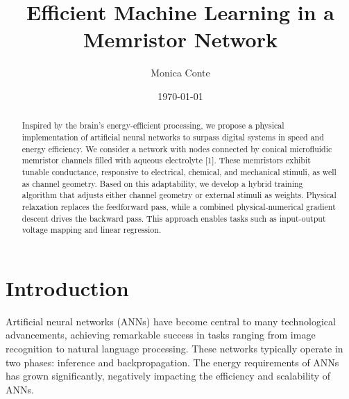 \documentclass[reprint,superscriptaddress,prb,showkeys]{revtex4-2}
\begin{document}
\title{Efficient Machine Learning in a Memristor Network}

\author{Monica Conte}

\date{\today}

\begin{abstract}
Inspired by the brain's energy-efficient processing, we propose a physical implementation of artificial neural networks to surpass digital systems in speed and energy efficiency. We consider a network with nodes connected by conical microfluidic memristor channels filled with aqueous electrolyte [1]. These memristors exhibit tunable conductance, responsive to electrical, chemical, and mechanical stimuli, as well as channel geometry. Based on this adaptability, we develop a hybrid training algorithm that adjusts either channel geometry or external stimuli as weights. Physical relaxation replaces the feedforward pass, while a combined physical-numerical gradient descent drives the backward pass. This approach enables tasks such as input-output voltage mapping and linear regression.
\end{abstract}
\maketitle

\renewcommand{\figurename}{FIG.}

\section{\label{sec:Intro}Introduction}


Artificial neural networks (ANNs) have become central to many technological advancements, achieving remarkable success in tasks ranging from image recognition to natural language processing. These networks typically operate in two phases: inference and backpropagation. The energy requirements of ANNs has grown significantly, negatively impacting the efficiency and scalability of ANNs\cite{energy_cost}.

\end{document}
